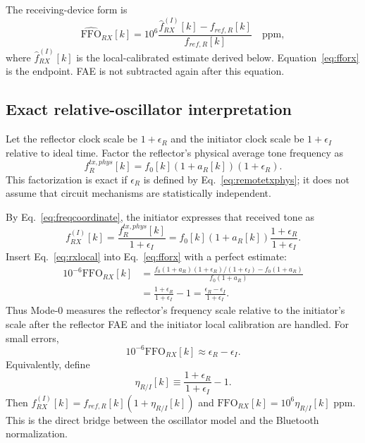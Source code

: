 \documentclass[10pt,a4paper]{article}
\newcommand{\FFO}{\mathrm{FFO}}
\begin{document}
The receiving-device form is
\begin{equation}
\widehat{\FFO}_{RX}[k]=10^6
\frac{\widehat f_{RX}^{(I)}[k]-f_{ref,R}[k]}{f_{ref,R}[k]}\quad\text{ppm},
\label{eq:fforx}
\end{equation}
where $\widehat f_{RX}^{(I)}[k]$ is the local-calibrated estimate derived below. Equation~\ref{eq:fforx} is the endpoint. FAE is not subtracted again after this equation.

\subsection{Exact relative-oscillator interpretation}
Let the reflector clock scale be $1+\epsilon_R$ and the initiator clock scale be $1+\epsilon_I$ relative to ideal time. Factor the reflector's physical average tone frequency as
\begin{equation}
f_R^{tx,phys}[k]=f_0[k](1+a_R[k])(1+\epsilon_R).
\label{eq:remotetxphys}
\end{equation}
This factorization is exact if $\epsilon_R$ is defined by Eq.~\ref{eq:remotetxphys}; it does not assume that circuit mechanisms are statistically independent.

By Eq.~\ref{eq:freqcoordinate}, the initiator expresses that received tone as
\begin{equation}
f_{RX}^{(I)}[k]
=\frac{f_R^{tx,phys}[k]}{1+\epsilon_I}
=f_0[k](1+a_R[k])\frac{1+\epsilon_R}{1+\epsilon_I}.
\label{eq:rxlocal}
\end{equation}
Insert Eq.~\ref{eq:rxlocal} into Eq.~\ref{eq:fforx} with a perfect estimate:
\begin{align}
10^{-6}\FFO_{RX}[k]
&=\frac{f_0(1+a_R)(1+\epsilon_R)/(1+\epsilon_I)-f_0(1+a_R)}{f_0(1+a_R)}\\
&=\frac{1+\epsilon_R}{1+\epsilon_I}-1
=\frac{\epsilon_R-\epsilon_I}{1+\epsilon_I}.
\label{eq:exactrelative}
\end{align}
Thus Mode-0 measures the reflector's frequency scale relative to the initiator's scale after the reflector FAE and the initiator local calibration are handled. For small errors,
\begin{equation}
10^{-6}\FFO_{RX}[k]\approx\epsilon_R-\epsilon_I.
\label{eq:firstorder}
\end{equation}
Equivalently, define
\begin{equation}
\eta_{R/I}[k]\equiv\frac{1+\epsilon_R}{1+\epsilon_I}-1.
\end{equation}
Then $f_{RX}^{(I)}[k]=f_{ref,R}[k](1+\eta_{R/I}[k])$ and $\FFO_{RX}[k]=10^6\eta_{R/I}[k]$ ppm. This is the direct bridge between the oscillator model and the Bluetooth normalization.
\end{document}
